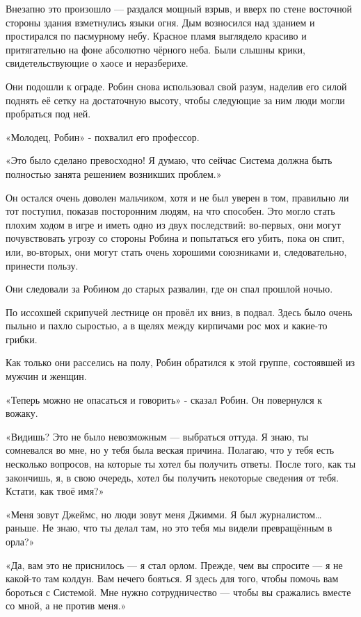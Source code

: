 \documentclass[a4paper,12pt]{book}
\begin{document}
\par
Внезапно это произошло — раздался мощный взрыв, и вверх по стене восточной стороны здания взметнулись языки огня. Дым возносился над зданием и простирался по пасмурному небу. Красное пламя выглядело красиво и притягательно на фоне абсолютно чёрного неба. Были слышны крики, свидетельствующие о хаосе и неразберихе.
\par
Они подошли к ограде. Робин снова использовал свой разум, наделив его силой поднять её сетку на достаточную высоту, чтобы следующие за ним люди могли пробраться под ней.
\par
«Молодец, Робин» - похвалил его профессор.
\par
«Это было сделано превосходно! Я думаю, что сейчас Система должна быть полностью занята решением возникших проблем.»
\par
Он остался очень доволен мальчиком, хотя и не был уверен в том, правильно ли тот поступил, показав посторонним людям, на что способен. Это могло стать плохим ходом в игре и иметь одно из двух последствий: во-первых, они могут почувствовать угрозу со стороны Робина и попытаться его убить, пока он спит, или, во-вторых, они могут стать очень хорошими союзниками и, следовательно, принести пользу.
\par
Они следовали за Робином до старых развалин, где он спал прошлой ночью.
\par
По иссохшей скрипучей лестнице он провёл их вниз, в подвал. Здесь было очень пыльно и пахло сыростью, а в щелях между кирпичами рос мох и какие-то грибки.
\par
Как только они расселись на полу, Робин обратился к этой группе, состоявшей из мужчин и женщин.
\par
«Теперь можно не опасаться и говорить» - сказал Робин. Он повернулся к вожаку.
\par
«Видишь? Это не было невозможным — выбраться оттуда. Я знаю, ты сомневался во мне, но у тебя была веская причина. Полагаю, что у тебя есть несколько вопросов, на которые ты хотел бы получить ответы. После того, как ты закончишь, я, в свою очередь, хотел бы получить некоторые сведения от тебя. Кстати, как твоё имя?»
\par
«Меня зовут Джеймс, но люди зовут меня Джимми. Я был журналистом… раньше. Не знаю, что ты делал там, но это тебя мы видели превращённым в орла?»
\par
«Да, вам это не приснилось — я стал орлом. Прежде, чем вы спросите — я не какой-то там колдун. Вам нечего бояться. Я здесь для того, чтобы помочь вам бороться с Системой. Мне нужно сотрудничество — чтобы вы сражались вместе со мной, а не против меня.»
\end{document}
